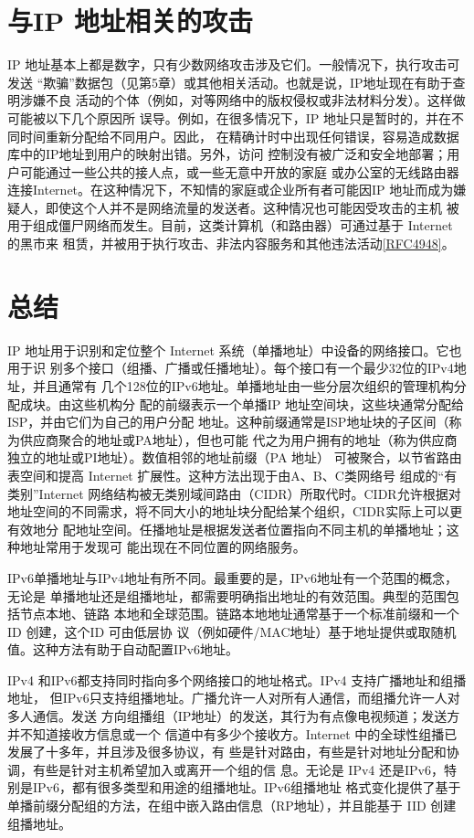 \section{与IP 地址相关的攻击}

IP 地址基本上都是数字，只有少数网络攻击涉及它们。一般情况下，执行攻击可发送
“欺骗”数据包（见第5章）或其他相关活动。也就是说，IP地址现在有助于查明涉嫌不良
活动的个体（例如，对等网络中的版权侵权或非法材料分发）。这样做可能被以下几个原因所
误导。例如，在很多情况下，IP 地址只是暂时的，并在不同时间重新分配给不同用户。因此，
在精确计时中出现任何错误，容易造成数据库中的IP地址到用户的映射出错。另外，访问
控制没有被广泛和安全地部署；用户可能通过一些公共的接人点，或一些无意中开放的家庭
或办公室的无线路由器连接Internet。在这种情况下，不知情的家庭或企业所有者可能因IP
地址而成为嫌疑人，即使这个人并不是网络流量的发送者。这种情况也可能因受攻击的主机
被用于组成僵尸网络而发生。目前，这类计算机（和路由器）可通过基于 Internet 的黑市来
租赁，并被用于执行攻击、非法内容服务和其他违法活动\href{https://www.rfc-editor.org/rfc/rfc4948}{[RFC4948]}。

\section{总结}

IP 地址用于识别和定位整个 Internet 系统（单播地址）中设备的网络接口。它也用于识
别多个接口（组播、广播或任播地址）。每个接口有一个最少32位的IPv4地址，并且通常有
几个128位的IPv6地址。单播地址由一些分层次组织的管理机构分配成块。由这些机构分
配的前缀表示一个单播IP 地址空间块，这些块通常分配给ISP，并由它们为自己的用户分配
地址。这种前缀通常是ISP地址块的子区间（称为供应商聚合的地址或PA地址），但也可能
代之为用户拥有的地址（称为供应商独立的地址或PI地址）。数值相邻的地址前缀（PA 地址）
可被聚合，以节省路由表空间和提高 Internet 扩展性。这种方法出现于由A、B、C类网络号
组成的“有类别”Internet 网络结构被无类别域间路由（CIDR）所取代时。CIDR允许根据对
地址空间的不同需求，将不同大小的地址块分配给某个组织，CIDR实际上可以更有效地分
配地址空间。任播地址是根据发送者位置指向不同主机的单播地址；这种地址常用于发现可
能出现在不同位置的网络服务。

IPv6单播地址与IPv4地址有所不同。最重要的是，IPv6地址有一个范围的概念，无论是
单播地址还是组播地址，都需要明确指出地址的有效范围。典型的范围包括节点本地、链路
本地和全球范围。链路本地地址通常基于一个标准前缀和一个ID 创建，这个ID 可由低层协
议（例如硬件/MAC地址）基于地址提供或取随机值。这种方法有助于自动配置IPv6地址。

IPv4 和IPv6都支持同时指向多个网络接口的地址格式。IPv4 支持广播地址和组播地址，
但IPv6只支持组播地址。广播允许一人对所有人通信，而组播允许一人对多人通信。发送
方向组播组（IP地址）的发送，其行为有点像电视频道；发送方并不知道接收方信息或一个
信道中有多少个接收方。Internet 中的全球性组播已发展了十多年，并且涉及很多协议，有
些是针对路由，有些是针对地址分配和协调，有些是针对主机希望加入或离开一个组的信
息。无论是 IPv4 还是IPv6，特别是IPv6，都有很多类型和用途的组播地址。IPv6组播地址
格式变化提供了基于单播前缀分配组的方法，在组中嵌入路由信息（RP地址），并且能基于
IID 创建组播地址。


